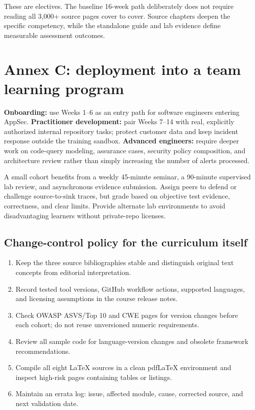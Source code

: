 \documentclass[
  letterpaper,
]{article}
\providecommand{\tightlist}{%
  \setlength{\itemsep}{0pt}\setlength{\parskip}{0pt}}
\begin{document}
These are electives. The baseline 16-week path deliberately does not
require reading all 3,000+ source pages cover to cover. Source chapters
deepen the specific competency, while the standalone guide and lab
evidence define measurable assessment outcomes.

\section{Annex C: deployment into a team learning
program}\label{annex-c-deployment-into-a-team-learning-program}

\textbf{Onboarding:} use Weeks 1--6 as an entry path for software
engineers entering AppSec. \textbf{Practitioner development:} pair Weeks
7--14 with real, explicitly authorized internal repository tasks;
protect customer data and keep incident response outside the training
sandbox. \textbf{Advanced engineers:} require deeper work on code-query
modeling, assurance cases, security policy composition, and architecture
review rather than simply increasing the number of alerts processed.

A small cohort benefits from a weekly 45-minute seminar, a 90-minute
supervised lab review, and asynchronous evidence submission. Assign
peers to defend or challenge source-to-sink traces, but grade based on
objective test evidence, correctness, and clear limits. Provide
alternate lab environments to avoid disadvantaging learners without
private-repo licenses.

\subsection{Change-control policy for the curriculum
itself}\label{change-control-policy-for-the-curriculum-itself}

\begin{enumerate}
\def\labelenumi{\arabic{enumi}.}
\tightlist
\item
  Keep the three source bibliographies stable and distinguish original
  text concepts from editorial interpretation.
\item
  Record tested tool versions, GitHub workflow actions, supported
  languages, and licensing assumptions in the course release notes.
\item
  Check OWASP ASVS/Top 10 and CWE pages for version changes before each
  cohort; do not reuse unversioned numeric requirements.
\item
  Review all sample code for language-version changes and obsolete
  framework recommendations.
\item
  Compile all eight LaTeX sources in a clean pdfLaTeX environment and
  inspect high-risk pages containing tables or listings.
\item
  Maintain an errata log: issue, affected module, cause, corrected
  source, and next validation date.
\end{enumerate}
\end{document}
